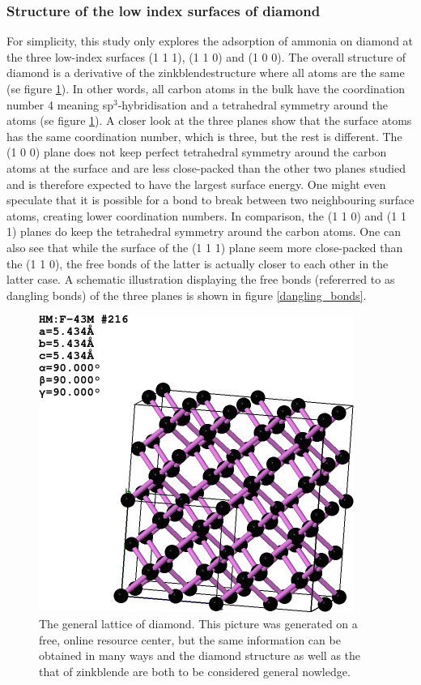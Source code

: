 \documentclass[12pt,a4paper]{article}
\begin{document}
\subsubsection{Structure of the low index surfaces of diamond}
For simplicity, this study only explores the adsorption of ammonia on diamond at the three low-index surfaces (1 1 1), (1 1 0) and (1 0 0). The overall structure of diamond is a derivative of the zinkblendestructure where all atoms are the same (se figure \ref{diamond_general}). In other words, all carbon atoms in the bulk have the coordination number 4 meaning sp$^3$-hybridisation and a tetrahedral symmetry around the atoms  (se figure \ref{diamond_general}). A closer look at the three planes show that the surface atoms has the same coordination number, which is three, but the rest is different. The (1 0 0) plane does not keep perfect tetrahedral symmetry around the carbon atoms at the surface and are less close-packed than the other two planes studied and is therefore expected to have the largest surface energy.  One might even speculate that it is possible for a bond to break between two neighbouring surface atoms, creating lower coordination numbers. In comparison, the (1 1 0) and (1 1 1) planes do keep the tetrahedral symmetry around the carbon atoms. One can also see that while the surface of the (1 1 1) plane seem more close-packed than the (1 1 0), the free bonds of the latter is actually closer to each other in the latter case. A schematic illustration displaying the free bonds (refererred to as dangling bonds) of the three planes is shown in figure  \ref{dangling_bonds}. 

\begin{figure} \captionsetup{width=.8\linewidth} \caption{The general lattice of diamond. This picture was generated on a free, online resource center, but the same information can be obtained in many ways and the diamond structure as well as the that of zinkblende are both to be considered general nowledge.} \label{diamond_general}
\includegraphics[width=.8\linewidth]{pictures/diamond_general.png}
\end{figure} 
\end{document}
